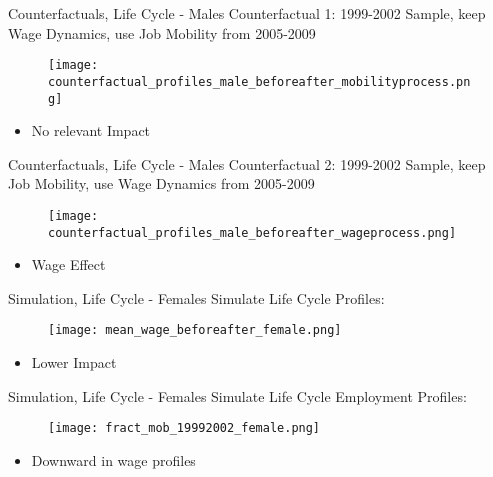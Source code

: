 \documentclass{beamer}
\begin{document}
\begin{frame}{Counterfactuals, Life Cycle - Males}\label{EstimationLCMalesMobility}
	Counterfactual 1: 1999-2002 Sample, keep Wage Dynamics, use Job Mobility from 2005-2009
	\begin{figure}[!t]
		\centering
		\begin{minipage}[b]{1\textwidth}{}
			\centering
			\texttt{[image: counterfactual\_profiles\_male\_beforeafter\_mobilityprocess.png]}
		\end{minipage}
	\end{figure}
	\begin{itemize}
		\setlength{\itemsep}{0.7 cm}
		\item No relevant Impact
	\end{itemize}
\end{frame}

\begin{frame}{Counterfactuals, Life Cycle - Males}\label{EstimationLCMalesWage}
	Counterfactual 2: 1999-2002 Sample, keep Job Mobility, use Wage Dynamics from 2005-2009
	\begin{figure}[!t]
		\centering
		\begin{minipage}[b]{1\textwidth}{}
			\centering
			\texttt{[image: counterfactual\_profiles\_male\_beforeafter\_wageprocess.png]}
		\end{minipage}
	\end{figure}
	\begin{itemize}
		\setlength{\itemsep}{0.7 cm}
		\item Wage Effect
	\end{itemize}
\end{frame}


\begin{frame}{Simulation, Life Cycle - Females}\label{EstimationLCFemalesI}
Simulate Life Cycle Profiles:
\begin{figure}[!t]
\centering
\begin{minipage}[b]{1\textwidth}{}
\centering
\texttt{[image: mean\_wage\_beforeafter\_female.png]}
\end{minipage}
\end{figure}
\begin{itemize}
\setlength{\itemsep}{0.7 cm}
\item Lower Impact
\end{itemize}
\end{frame}

\begin{frame}{Simulation, Life Cycle - Females}\label{EstimationLCFemalesII}
	Simulate Life Cycle Employment Profiles:
	\begin{figure}[!t]
		\centering
		\begin{minipage}[b]{1\textwidth}{}
			\centering
			\texttt{[image: fract\_mob\_19992002\_female.png]}
		\end{minipage}
	\end{figure}
	\begin{itemize}
		\setlength{\itemsep}{0.7 cm}
		\item Downward in wage profiles
	\end{itemize}
\end{frame}
\end{document}
